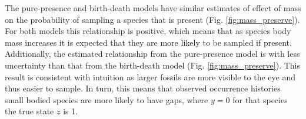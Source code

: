 \documentclass[12pt,letterpaper]{article}
\begin{document}
The pure-presence and birth-death models have similar estimates of effect of mass on the probability of sampling a species that is present (Fig. \ref{fig:mass_preserve}). For both models this relationship is positive, which means that as species body mass increases it is expected that they are more likely to be sampled if present. Additionally, the estimated relationship from the pure-presence model is with less uncertainty than that from the birth-death model (Fig. \ref{fig:mass_preserve}). This result is consistent with intuition as larger fossils are more visible to the eye and thus easier to sample. In turn, this means that observed occurrence histories small bodied species are more likely to have gaps, where \(y = 0\) for that species the true state \(z\) is 1. 
%
\end{document}
